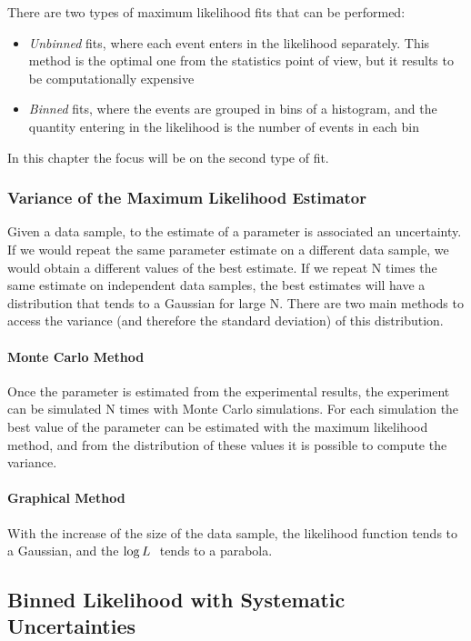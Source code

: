 There are two types of maximum likelihood fits that can be performed:
\begin{itemize}
\item \textit{Unbinned} fits, where each event enters in the likelihood separately. This method is the optimal one from the statistics point of view, but it results to be computationally expensive
\item \textit{Binned} fits, where the events are grouped in bins of a histogram, and the quantity entering in the likelihood is the number of events in each bin
\end{itemize}

In this chapter the focus will be on the second type of fit.

\subsubsection*{Variance of the Maximum Likelihood Estimator}

Given a data sample, to the estimate of a parameter is associated an uncertainty. If we would repeat the same parameter estimate on a different data sample, we would obtain a different values of the best estimate. If we repeat N times the same estimate on independent data samples, the best estimates will have a distribution that tends to a Gaussian for large N. There are two main methods to access the variance (and therefore the standard deviation) of this distribution.

\paragraph{Monte Carlo Method} Once the parameter is estimated from the experimental results, the experiment can be simulated N times with Monte Carlo simulations. For each simulation the best value of the parameter can be estimated with the maximum likelihood method, and from the distribution of these values it is possible to compute the variance.


\paragraph{Graphical Method} With the increase of the size of the data sample, the likelihood function tends to a Gaussian, and the $\log{L} \ $ tends to a parabola.  

\subsection{Binned Likelihood with Systematic Uncertainties}

